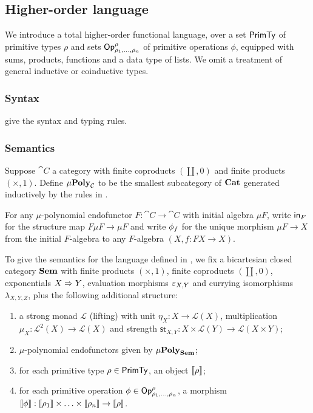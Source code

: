 \subsection{Higher-order language}

We introduce a total higher-order functional language, over a set $\mathsf{PrimTy}$ of primitive types $\rho$ and sets
$\mathsf{Op}^\rho_{\rho_1,\ldots,\rho_n}$ of primitive operations $\phi$, equipped with sums, products, functions
and a data type of lists. We omit a treatment of general inductive or coinductive types.

\subsubsection{Syntax}
\label{sec:language:syntax}





 give the syntax and typing rules.

\subsubsection{Semantics}
\label{sec:language:semantics}




\begin{definition}[$\mu$-polynomial]
Suppose $\cat{C}$ a category with finite coproducts $(\coprod, 0)$ and finite products $(\times, 1)$. Define
$\mu\mathbf{Poly}_{\mathcal{C}}$ to be the smallest subcategory of $\mathbf{Cat}$ generated inductively by the rules in
.
\end{definition}

For any $\mu$-polynomial endofunctor $F: \cat{C} \to \cat{C}$ with initial algebra $\mu F$, write $\mathsf{in}_F$
for the structure map $F\mu F \to \mu F$ and write $\phi_f$ for the unique morphism $\mu F \to X$ from the
initial $F$-algebra to any $F$-algebra $(X, f: FX \to X)$.

To give the semantics for the language defined in , we fix a bicartesian closed
category $\mathbf{Sem}$ with finite products $(\times, 1)$, finite coproducts $(\coprod, 0)$, exponentials
$X \Rightarrow Y$, evaluation morphisms $\varepsilon_{X,Y}$ and currying isomorphisms $\lambda_{X,Y,Z}$, plus the
following additional structure:
\begin{enumerate}
\item a strong monad $\mathcal{L}$ (lifting) with unit $\eta_X: X \to \mathcal{L}(X)$, multiplication $\mu_X:
\mathcal{L}^2(X) \to \mathcal{L}(X)$ and strength $\mathsf{st}_{X,Y}: X \times \mathcal{L}(Y) \to
\mathcal{L}(X \times Y)$;
\item $\mu$-polynomial endofunctors given by $\mu\mathbf{Poly}_{\mathbf{Sem}}$;
\item for each primitive type $\rho \in \mathsf{PrimTy}$, an object $\llbracket \rho \rrbracket$;
\item for each primitive operation $\phi \in \mathsf{Op}^\rho_{\rho_1,\ldots,\rho_n}$, a morphism $\llbracket \phi \rrbracket:
\llbracket \rho_1 \rrbracket \times \ldots \times \llbracket \rho_n \rrbracket \to \llbracket \rho \rrbracket$.
\end{enumerate}

